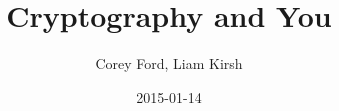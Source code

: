 \documentclass{beamer}
\title{Cryptography and You}
\author{Corey Ford, Liam Kirsh}
\institute{The White Hat}
\date{2015-01-14}
\begin{document}
\frame{\titlepage}
\end{document}
